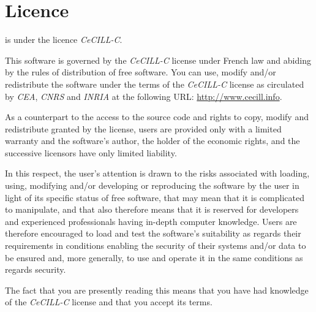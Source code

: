 \section{Licence}\label{Licence}

\GTG{} is under the licence \emph{CeCILL-C}.

\medskip

This software is governed by the \emph{CeCILL-C} license under French law
and abiding by the rules of distribution of free software. You can
use, modify and/or redistribute the software under the terms of the
\emph{CeCILL-C} license as circulated by \emph{CEA}, \emph{CNRS} and \emph{INRIA} at the following
URL: \url{http://www.cecill.info}.

\medskip

As a counterpart to the access to the source code and rights to copy,
modify and redistribute granted by the license, users are provided
only with a limited warranty and the software's author, the holder of
the economic rights, and the successive licensors have only limited
liability.

\medskip

In this respect, the user's attention is drawn to the risks associated
with loading, using, modifying and/or developing or reproducing the
software by the user in light of its specific status of free software,
that may mean that it is complicated to manipulate, and that also
therefore means that it is reserved for developers and experienced
professionals having in-depth computer knowledge. Users are therefore
encouraged to load and test the software's suitability as regards
their requirements in conditions enabling the security of their
systems and/or data to be ensured and, more generally, to use and
operate it in the same conditions as regards security.

\medskip

The fact that you are presently reading this means that you have had
knowledge of the \emph{CeCILL-C} license and that you accept its terms.
